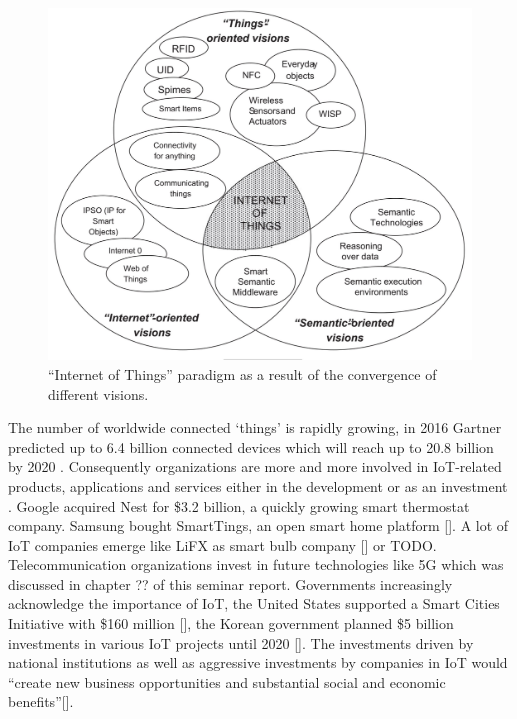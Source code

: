 	\begin{figure}[ht]
	    \begin{center}
	    \includegraphics[scale=0.35]{Talk11/iot_visions.jpg}
	    \end{center}
	    \caption{``Internet of Things'' paradigm as a result of the convergence of different visions.}
	    \label{fig:iot_visions}
    \end{figure}

	The number of worldwide connected `things' is rapidly growing, in 2016 Gartner predicted up to 6.4 billion connected devices which will reach up to 20.8 billion by 2020 \cite{gartner}. Consequently organizations are more and more involved in IoT-related products, applications and services either in the development or as an investment \cite{ju}. Google acquired Nest for \$3.2 billion, a quickly growing smart thermostat company. Samsung bought SmartTings, an open smart home platform []. A lot of IoT companies emerge like LiFX as smart bulb company [] or TODO. Telecommunication organizations invest in future technologies like 5G which was discussed in chapter ?? of this seminar report. Governments increasingly acknowledge the importance of IoT, the United States supported a Smart Cities Initiative with \$160 million [], the Korean government planned \$5 billion investments in various IoT projects until 2020 []. The investments driven by national institutions as well as aggressive investments by companies in IoT would ``create new business opportunities and substantial social and economic benefits''[]. 

